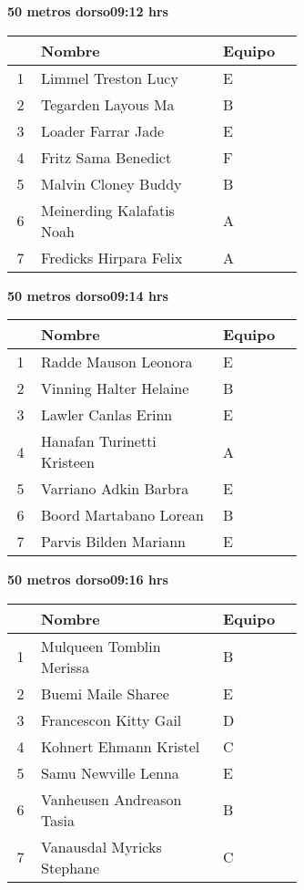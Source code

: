 \begin{minipage}{0.95\linewidth}
\begin{center}
\textbf{
50 metros dorso\hspace{1cm}09:12 hrs}
\end{center}
\begin{tabular}{cp{0.63\linewidth}l}
\hline
& \textbf{Nombre} & \textbf{Equipo} \\ \hline
1 & Limmel Treston Lucy & E \\ 
2 & Tegarden Layous Ma & B \\ 
3 & Loader Farrar Jade & E \\ 
4 & Fritz Sama Benedict & F \\ 
5 & Malvin Cloney Buddy & B \\ 
6 & Meinerding Kalafatis Noah & A \\ 
7 & Fredicks Hirpara Felix & A \\ 
\end{tabular}
\end{minipage}
\begin{minipage}{0.95\linewidth}
\begin{center}
\textbf{
50 metros dorso\hspace{1cm}09:14 hrs}
\end{center}
\begin{tabular}{cp{0.63\linewidth}l}
\hline
& \textbf{Nombre} & \textbf{Equipo} \\ \hline
1 & Radde Mauson Leonora & E \\ 
2 & Vinning Halter Helaine & B \\ 
3 & Lawler Canlas Erinn & E \\ 
4 & Hanafan Turinetti Kristeen & A \\ 
5 & Varriano Adkin Barbra & E \\ 
6 & Boord Martabano Lorean & B \\ 
7 & Parvis Bilden Mariann & E \\ 
\end{tabular}
\end{minipage}
\begin{minipage}{0.95\linewidth}
\begin{center}
\textbf{
50 metros dorso\hspace{1cm}09:16 hrs}
\end{center}
\begin{tabular}{cp{0.63\linewidth}l}
\hline
& \textbf{Nombre} & \textbf{Equipo} \\ \hline
1 & Mulqueen Tomblin Merissa & B \\ 
2 & Buemi Maile Sharee & E \\ 
3 & Francescon Kitty Gail & D \\ 
4 & Kohnert Ehmann Kristel & C \\ 
5 & Samu Newville Lenna & E \\ 
6 & Vanheusen Andreason Tasia & B \\ 
7 & Vanausdal Myricks Stephane & C \\ 
\end{tabular}
\end{minipage}
